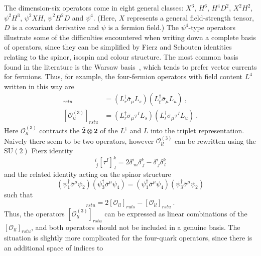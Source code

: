 The dimension-six operators come in eight general classes: $X^{3}$, $H^{6}$,
$H^{4}D^{2}$, $X^{2}H^{2}$, $\psi^{2}H^{3}$, $\psi^{2}XH$, $\psi^{2}H^{2}D$ and
$\psi^{4}$. (Here, $X$ represents a general field-strength tensor, $D$ is a
covariant derivative and $\psi$ is a fermion field.) The $\psi^{4}$-type
operators illustrate some of the difficulties encountered when writing down a
complete basis of operators, since they can be simplified by Fierz and Schouten
identities relating to the spinor, isospin and colour structure. The most common
basis found in the literature is the Warsaw basis~\cite{Buchmuller:1985jz,
  Grzadkowski:2010es}, which tends to prefer vector currents for fermions. Thus,
for example, the four-fermion operators with field content $L^{4}$ written in
this way are
\begin{align}
  [\mathcal{O}_{ll}]_{rstu} &= (L^{\dagger}_r \bar{\sigma}_{\mu} L_s) (L^{\dagger}_t \bar{\sigma}_{\mu} L_u) \ , \\
  [\mathcal{O}_{ll}^{(3)}]_{rstu} &= (L_r^{\dagger} \bar{\sigma}_{\mu} \tau^I L_s) (L_t^{\dagger} \bar{\sigma}_{\mu} \tau^I L_u) \ .
\end{align}
Here $\mathcal{O}_{ll}^{(3)}$ contracts the
$\bar{\mathbf{2}} \otimes \mathbf{2}$ of the $L^{\dagger}$ and $L$ into the
triplet representation. Naively there seem to be two operators, however
$\mathcal{O}_{ll}^{(3)}$ can be rewritten using the $\mathrm{SU}(2)$ Fierz
identity
\begin{equation}
  [\tau^{I}]^{i}_{\ j} [\tau^{I}]^{k}_{\ l} = 2\delta^{i}_{\ m} \delta^{k}_{\ j} - \delta^{i}_{\ j} \delta^{k}_{\ l}
\end{equation}
and the related identity acting on the spinor structure
\begin{equation}
  \label{eq:ch1-spinor-fierz}
  (\psi_{1}^{\dagger} \bar{\sigma}^{\mu} \psi_{2})  (\psi_{3}^{\dagger} \bar{\sigma}^{\mu} \psi_{4}) = (\psi_{1}^{\dagger} \bar{\sigma}^{\mu} \psi_{4})  (\psi_{3}^{\dagger} \bar{\sigma}^{\mu} \psi_{2})
\end{equation}
such that
\begin{equation}
  [\mathcal{O}_{ll}^{(3)}]_{rstu} = 2 [\mathcal{O}_{ll}]_{ruts} - [\mathcal{O}_{ll}]_{rstu} \ .
\end{equation}
Thus, the operators $[\mathcal{O}_{ll}^{(3)}]_{rstu}$ can be expressed as linear
combinations of the $[\mathcal{O}_{ll}]_{rstu}$, and both operators should not
be included in a genuine basis. The situation is slightly more complicated for
the four-quark operators, since there is an additional space of indices to
